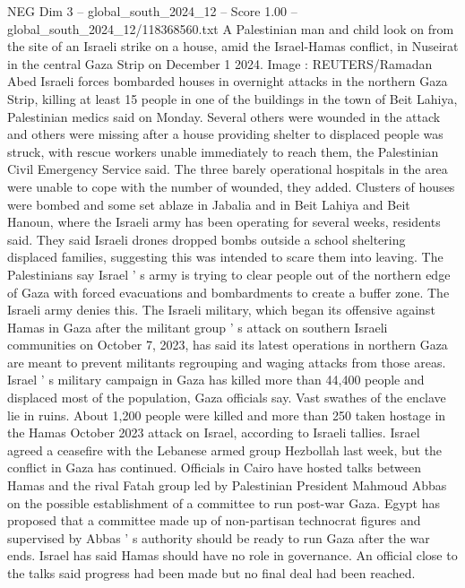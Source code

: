 \begin{textsample}{NEG Dim 3 – global\_south\_2024\_12 – Score 1.00 – global\_south\_2024\_12/118368560.txt}  \label{ex:f3_neg_067}
A Palestinian man and child look on from the site of an Israeli strike on a house, amid the Israel-Hamas conflict, in Nuseirat in the central Gaza Strip on December 1 2024.
Image : REUTERS/Ramadan Abed Israeli forces bombarded houses in overnight attacks in the northern Gaza Strip, killing at least 15 people in one of the buildings in the town of Beit Lahiya, Palestinian medics said on Monday.
Several others were wounded in the attack and others were missing after a house providing shelter to displaced people was struck, with rescue workers unable immediately to reach them, the Palestinian Civil Emergency Service said.
The three barely operational hospitals in the area were unable to cope with the number of wounded, they added.
Clusters of houses were bombed and some set ablaze in Jabalia and in Beit Lahiya and Beit Hanoun, where the Israeli army has been operating for several weeks, residents said.
They said Israeli drones dropped bombs outside a school sheltering displaced families, suggesting this was intended to scare them into leaving.
The Palestinians say Israel ' s army is trying to clear people out of the northern edge of Gaza with forced evacuations and bombardments to create a buffer zone.
The Israeli army denies this.
The Israeli military, which began its offensive against Hamas in Gaza after the militant group ' s attack on southern Israeli communities on October 7, 2023, has said its latest operations in northern Gaza are meant to prevent militants regrouping and waging attacks from those areas.
Israel ' s military campaign in Gaza has killed more than 44,400 people and displaced most of the population, Gaza officials say.
Vast swathes of the enclave lie in ruins.
About 1,200 people were killed and more than 250 taken hostage in the Hamas October 2023 attack on Israel, according to Israeli tallies.
Israel agreed a ceasefire with the Lebanese armed group Hezbollah last week, but the conflict in Gaza has continued.
Officials in Cairo have hosted talks between Hamas and the rival Fatah group led by Palestinian President Mahmoud Abbas on the possible establishment of a committee to run post-war Gaza.
Egypt has proposed that a committee made up of non-partisan technocrat figures and supervised by Abbas ' s authority should be ready to run Gaza after the war ends.
Israel has said Hamas should have no role in governance.
An official close to the talks said progress had been made but no final deal had been reached.

\end{textsample}
